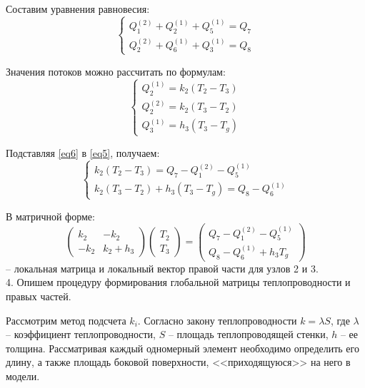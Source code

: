 \documentclass[a4paper, 12pt]{article}
\begin{document}
Составим уравнения равновесия:
\begin{equation} \label{eq5}
\begin{cases}
Q_{1}^{(2)} + Q_{2}^{(1)} + Q_{5}^{(1)} = Q_7\\
Q_{2}^{(2)} + Q_{6}^{(1)} + Q_{3}^{(1)} = Q_8
\end{cases}
\end{equation} 

Значения потоков можно рассчитать по формулам:
\begin{equation} \label{eq6}
\begin{cases}
Q_{2}^{(1)} = k_2 (T_2 - T_3)\\
Q_{2}^{(2)} = k_2 (T_3 - T_2)\\
Q_{3}^{(1)} = h_3 (T_3 - T_g)
\end{cases}
\end{equation} 

Подставляя \eqref{eq6} в \eqref{eq5}, получаем:
\begin{equation} \label{eq7}
\begin{cases}
k_2 (T_2 - T_3)  = Q_7 - Q_{1}^{(2)} - Q_{5}^{(1)}\\
k_2 (T_3 - T_2) + h_3 (T_3 - T_g) = Q_8 - Q_{6}^{(1)}
\end{cases}
\end{equation} 

В матричной форме:
\begin{equation} \label{eq8}
\begin{pmatrix}
k_{2} & -k_{2}\\
-k_{2} & k_{2} + h_3
\end{pmatrix}
\begin{pmatrix}
T_2\\
T_3
\end{pmatrix} =
\begin{pmatrix}
Q_7 - Q_{1}^{(2)} - Q_{5}^{(1)}\\
Q_8 - Q_{6}^{(1)} + h_3 T_g
\end{pmatrix}
\end{equation} 
-- локальная матрица и локальный вектор правой части для узлов 2 и 3. \\

4. Опишем процедуру формирования глобальной матрицы теплопроводности и правых частей.

Рассмотрим метод подсчета $k_i$. Согласно закону теплопроводности $k = \lambda S$, где $\lambda$ – коэффициент
теплопроводности, $S$ – площадь теплопроводящей стенки, $h$ – ее толщина. Рассматривая каждый
одномерный элемент необходимо определить его длину, а также площадь боковой поверхности, <<приходящуюся>>
на него в модели.
\end{document}
